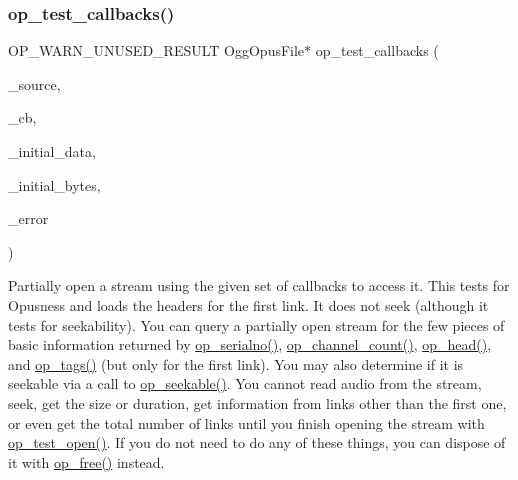 \subsubsection{\texorpdfstring{op\+\_\+test\+\_\+callbacks()}{op\_test\_callbacks()}}
{\footnotesize\ttfamily O\+P\+\_\+\+W\+A\+R\+N\+\_\+\+U\+N\+U\+S\+E\+D\+\_\+\+R\+E\+S\+U\+LT Ogg\+Opus\+File$\ast$ op\+\_\+test\+\_\+callbacks (\begin{DoxyParamCaption}\item[{\hyperlink{png_8h_ac9c84fa68bbad002983e35ce3663c686}{void} $\ast$}]{\+\_\+source,  }\item[{\hyperlink{zconf_8h_a2c212835823e3c54a8ab6d95c652660e}{const} \hyperlink{struct_opus_file_callbacks}{Opus\+File\+Callbacks} $\ast$}]{\+\_\+cb,  }\item[{\hyperlink{zconf_8h_a2c212835823e3c54a8ab6d95c652660e}{const} unsigned char $\ast$}]{\+\_\+initial\+\_\+data,  }\item[{size\+\_\+t}]{\+\_\+initial\+\_\+bytes,  }\item[{int $\ast$}]{\+\_\+error }\end{DoxyParamCaption})}

Partially open a stream using the given set of callbacks to access it. This tests for Opusness and loads the headers for the first link. It does not seek (although it tests for seekability). You can query a partially open stream for the few pieces of basic information returned by \hyperlink{group__stream__info_ga41992ce6f066e07609e5fe2ccd961f40}{op\+\_\+serialno()}, \hyperlink{group__stream__info_ga42c829e67c0ce8359bfbfc31a45c04f4}{op\+\_\+channel\+\_\+count()}, \hyperlink{group__stream__info_gabae95dfa8a278a305213332e295443bb}{op\+\_\+head()}, and \hyperlink{group__stream__info_ga4b9b8b62a9fb04aee64c288e106a4822}{op\+\_\+tags()} (but only for the first link). You may also determine if it is seekable via a call to \hyperlink{group__stream__info_ga9272a4a6ac9e01fbc549008f5ff58b4c}{op\+\_\+seekable()}. You cannot read audio from the stream, seek, get the size or duration, get information from links other than the first one, or even get the total number of links until you finish opening the stream with \hyperlink{group__stream__open__close_ga7b7f1c778ce6ced5538ce66e292d894d}{op\+\_\+test\+\_\+open()}. If you do not need to do any of these things, you can dispose of it with \hyperlink{group__stream__open__close_gaf494ef9aa761647d8167c49507560d1c}{op\+\_\+free()} instead.

